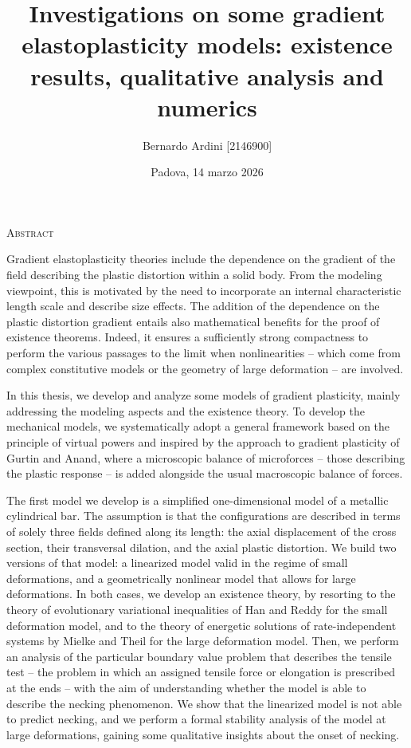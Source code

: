 \documentclass[a4paper,10pt,twoside]{amsbook}
\numberwithin{section}{chapter}
\numberwithin{equation}{chapter}
\theoremstyle{definition}
\begin{document}
\author{Bernardo Ardini [2146900]}
\date{Padova, 14 marzo 2026}
\title{\textbf{Investigations on some gradient elastoplasticity models: existence results, qualitative analysis and numerics}}

\frontmatter



\setcounter{page}{2}

\cleardoublepage

\thispagestyle{empty}
\vspace*{\fill}

\begin{center}
\large\textsc{Abstract}
\end{center}
\vspace{1em}
Gradient elastoplasticity theories include the dependence on the gradient of the field describing the plastic distortion within a solid body. From the modeling viewpoint, this is motivated by the need to incorporate an internal characteristic length scale and describe size effects. The addition of the dependence on the plastic distortion gradient entails also mathematical benefits for the proof of existence theorems. Indeed, it ensures a sufficiently strong compactness to perform the various passages to the limit when nonlinearities -- which come from complex constitutive models or the geometry of large deformation -- are involved.

In this thesis, we develop and analyze some models of gradient plasticity, mainly addressing the modeling aspects and the existence theory. To develop the mechanical models, we systematically adopt a general framework based on the principle of virtual powers and inspired by the approach to gradient plasticity of Gurtin and Anand, where a microscopic balance of microforces -- those describing the plastic response -- is added alongside the usual macroscopic balance of forces.

The first model we develop is a simplified one-dimensional model of a metallic cylindrical bar. The assumption is that the configurations are described in terms of solely three fields defined along its length: the axial displacement of the cross section, their transversal dilation, and the axial plastic distortion. We build two versions of that model: a linearized model valid in the regime of small deformations, and a geometrically nonlinear model that allows for large deformations. In both cases, we develop an existence theory, by resorting to the theory of evolutionary variational inequalities of Han and Reddy for the small deformation model, and to the theory of energetic solutions of rate-independent systems by Mielke and Theil for the large deformation model. Then, we perform an analysis of the particular boundary value problem that describes the tensile test -- the problem in which an assigned tensile force or elongation is prescribed at the ends -- with the aim of understanding whether the model is able to describe the necking phenomenon. We show that the linearized model is not able to predict necking, and we perform a formal stability analysis of the model at large deformations, gaining some qualitative insights about the onset of necking.
\end{document}
